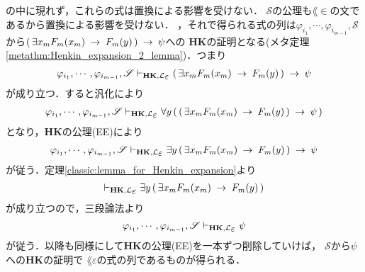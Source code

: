 \begin{sketch}
{			の中に現れず，これらの式は置換による影響を受けない．
			$\mathscr{S}$の公理も$\lang{\in}$の文であるから置換による影響を受けない．
		}，それで得られる式の列は$\varphi_{i_{1}},\cdots,\varphi_{i_{m-1}},\mathscr{S}$
		から$(\, \exists x_{m} F_{m}(x_{m}) \hspace{0.25em}\rightarrow\hspace{0.25em} F_{m}(y)\, ) \hspace{0.25em}\rightarrow\hspace{0.25em} \psi$への
		{\bf HK}の証明となる(メタ定理\ref{metathm:Henkin_expansion_2_lemma})．つまり
		\begin{align}
			\varphi_{i_{1}},\cdots,\varphi_{i_{m-1}},\mathscr{S} 
			\provable{\mbox{{\bf HK}},\lang{\varepsilon}} 
			(\, \exists x_{m} F_{m}(x_{m}) \rarrow F_{m}(y)\, ) \rarrow \psi
		\end{align}
		が成り立つ．すると汎化により
		\begin{align}
			\varphi_{i_{1}},\cdots,\varphi_{i_{m-1}},\mathscr{S} 
			\provable{\mbox{{\bf HK}},\lang{\varepsilon}}
			\forall y\, (\, (\, \exists x_{m} F_{m}(x_{m}) \rarrow F_{m}(y)\, ) \rarrow \psi\, )
		\end{align}
		となり，{\bf HK}の公理(EE)により
		\begin{align}
			\varphi_{i_{1}},\cdots,\varphi_{i_{m-1}},\mathscr{S} 
			\provable{\mbox{{\bf HK}},\lang{\varepsilon}}
			\exists y\, (\, \exists x_{m} F_{m}(x_{m}) \rarrow F_{m}(y)\, ) \rarrow \psi
		\end{align}
		が従う．定理\ref{classic:lemma_for_Henkin_expansion}より
		\begin{align}
			\provable{\mbox{{\bf HK}},\lang{\varepsilon}}
			\exists y\, (\, \exists x_{m} F_{m}(x_{m}) \rarrow F_{m}(y)\, )
		\end{align}
		が成り立つので，三段論法より
		\begin{align}
			\varphi_{i_{1}},\cdots,\varphi_{i_{m-1}},\mathscr{S} 
			\provable{\mbox{{\bf HK}},\lang{\varepsilon}} \psi
		\end{align}
		が従う．以降も同様にして{\bf HK}の公理(EE)を一本ずつ削除していけば，
		$\mathscr{S}$から$\psi$への{\bf HK}の証明で
		$\lang{\varepsilon}$の式の列であるものが得られる．
		\QED
	\end{sketch}
	
